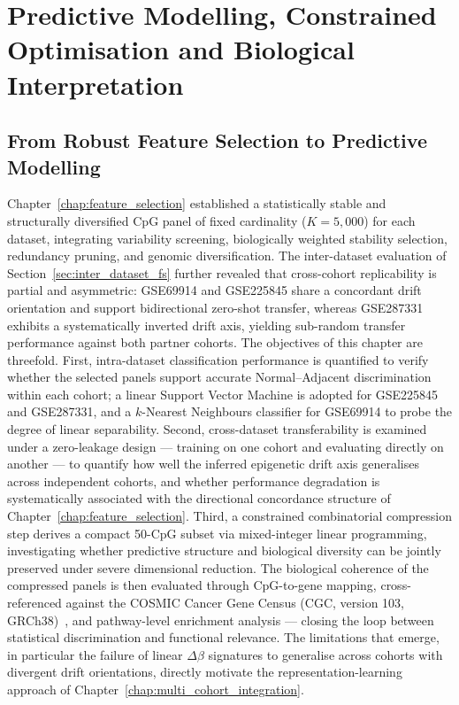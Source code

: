 \chapter{Predictive Modelling, Constrained Optimisation and Biological Interpretation}
\label{chap:model_training_evaluation}

\section{From Robust Feature Selection to Predictive Modelling}

Chapter~\ref{chap:feature_selection} established a statistically stable and 
structurally diversified CpG panel of fixed cardinality ($K = 5{,}000$) for 
each dataset, integrating variability screening, biologically weighted stability 
selection, redundancy pruning, and genomic diversification. The inter-dataset 
evaluation of Section~\ref{sec:inter_dataset_fs} further revealed that cross-cohort replicability is 
partial and asymmetric: GSE69914 and GSE225845 share a concordant drift 
orientation and support bidirectional zero-shot transfer, whereas GSE287331 
exhibits a systematically inverted drift axis, yielding sub-random transfer 
performance against both partner cohorts.
The objectives of this chapter are threefold. First, intra-dataset 
classification performance is quantified to verify whether the selected panels 
support accurate Normal--Adjacent discrimination within each cohort; a linear 
Support Vector Machine is adopted for GSE225845 and GSE287331, and a 
$k$-Nearest Neighbours classifier for GSE69914 to probe the degree of linear 
separability. Second, cross-dataset transferability is examined under a 
zero-leakage design — training on one cohort and evaluating directly on another 
— to quantify how well the inferred epigenetic drift axis generalises across 
independent cohorts, and whether performance degradation is systematically 
associated with the directional concordance structure of 
Chapter~\ref{chap:feature_selection}. Third, a constrained combinatorial 
compression step derives a compact 50-CpG subset via mixed-integer linear 
programming, investigating whether predictive structure and biological diversity 
can be jointly preserved under severe dimensional reduction.
The biological coherence of the compressed panels is then evaluated through 
CpG-to-gene mapping, cross-referenced against the COSMIC Cancer Gene Census 
(CGC, version 103, GRCh38)~\cite{sondka2018cosmic,cosmic_cgc_v103}, and 
pathway-level enrichment analysis — closing the loop between statistical 
discrimination and functional relevance. The limitations that emerge, in 
particular the failure of linear $\Delta\beta$ signatures to generalise across 
cohorts with divergent drift orientations, directly motivate the 
representation-learning approach of Chapter~\ref{chap:multi_cohort_integration}.

